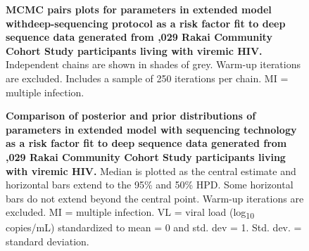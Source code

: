 \documentclass[10pt,letterpaper]{article}
\begin{document}
\begin{figure}[!ht]
\caption{{\bf MCMC pairs plots for parameters in extended model withdeep-sequencing protocol as a risk factor fit to deep sequence data generated from ,029 Rakai Community Cohort Study participants living with viremic HIV.} Independent chains are shown in shades of grey. Warm-up iterations are excluded. Includes a sample of 250 iterations per chain. MI = multiple infection. }
\end{figure}

\begin{figure}[!ht]
\caption{{\bf Comparison of posterior and prior distributions of parameters in extended model with sequencing technology as a risk factor fit to deep sequence data generated from ,029 Rakai Community Cohort Study participants living with viremic HIV.} Median is plotted as the central estimate and horizontal bars extend to the 95\% and 50\% HPD. Some horizontal bars do not extend beyond the central point. Warm-up iterations are excluded. MI = multiple infection. VL = viral load (log\textsubscript{10} copies/mL) standardized to mean = 0 and std. dev = 1. Std. dev. = standard deviation. }
\end{figure}
\end{document}
